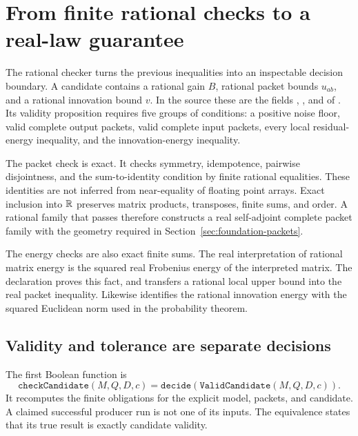 \section{From finite rational checks to a real-law guarantee}
\label{sec:foundation-rational-checker}

The rational checker turns the previous inequalities into an inspectable decision boundary. A candidate contains a rational gain $B$, rational packet bounds $u_{ab}$, and a rational innovation bound $v$. In the source these are the fields , , and  of . Its validity proposition requires five groups of conditions: a positive noise floor, valid complete output packets, valid complete input packets, every local residual-energy inequality, and the innovation-energy inequality.

The packet check is exact. It checks symmetry, idempotence, pairwise disjointness, and the sum-to-identity condition by finite rational equalities. These identities are not inferred from near-equality of floating point arrays. Exact inclusion into $\mathbb R$ preserves matrix products, transposes, finite sums, and order. A rational family that passes therefore constructs a real self-adjoint complete packet family with the geometry required in Section~\ref{sec:foundation-packets}.

The energy checks are also exact finite sums. The real interpretation of rational matrix energy is the squared real Frobenius energy of the interpreted matrix. The declaration  proves this fact, and  transfers a rational local upper bound into the real packet inequality. Likewise  identifies the rational innovation energy with the squared Euclidean norm used in the probability theorem.

\subsection{Validity and tolerance are separate decisions}

The first Boolean function is
\[
 \texttt{checkCandidate}(M,Q,D,c)
   =\texttt{decide}(\texttt{ValidCandidate}(M,Q,D,c)).
\]
It recomputes the finite obligations for the explicit model, packets, and candidate. A claimed successful producer run is not one of its inputs. The equivalence  states that its true result is exactly candidate validity.

